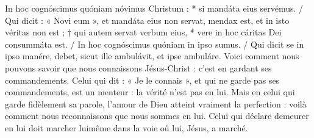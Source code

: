 \documentclass[Session2024.tex]{subfiles}
\begin{document}
{In hoc cognóscimus quóniam nóvimus Christum : * si mandáta eius
servémus. / Qui dicit : « Novi eum », et mandáta eius non servat, mendax
est, et in isto véritas non est ; † qui autem servat verbum eius, * vere in
hoc cáritas Dei consummáta est. / In hoc cognóscimus quóniam in ipso
sumus. / Qui dicit se in ipso manére, debet, sicut ille ambulávit, et ipse
ambuláre.}
{Voici comment nous pouvons savoir que nous connaissons Jésus-Christ :
c’est en gardant ses commandements. Celui qui dit : « Je le connais »,
et qui ne garde pas ses commandements, est un menteur : la vérité n’est
pas en lui. Mais en celui qui garde fidèlement sa parole, l’amour de Dieu
atteint vraiment la perfection : voilà comment nous reconnaissons que
nous sommes en lui. Celui qui déclare demeurer en lui doit marcher luimême
dans la voie où lui, Jésus, a marché.}





\blessing

\end{document}
